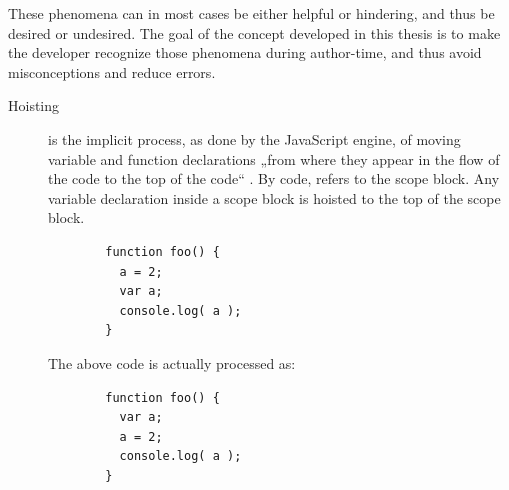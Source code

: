 These phenomena can in most cases be either helpful or hindering, and
thus be desired or undesired. The goal of the concept developed in this
thesis is to make the developer recognize those phenomena during
author-time, and thus avoid misconceptions and reduce errors.

\begin{description}
\item[Hoisting]
is the implicit process, as done by the JavaScript engine, of moving
variable and function declarations „from where they appear in the flow
of the code to the top of the code“ \cite{getify}. By code,
 refers to the scope block. Any variable declaration
inside a scope block is hoisted to the top of the scope block.

\begin{verbatim}
        function foo() {
          a = 2;
          var a;
          console.log( a );
        }
\end{verbatim}

The above code is actually processed as:

\begin{verbatim}
        function foo() {
          var a;
          a = 2;
          console.log( a );
        }
\end{verbatim}


\end{description}
